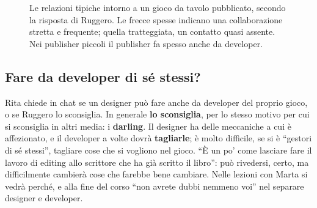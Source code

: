 \begin{figure}[htbp]
\centering
{}
\caption{Le relazioni tipiche intorno a un gioco da tavolo pubblicato, secondo la
risposta di Ruggero. Le frecce spesse indicano una collaborazione stretta e
frequente; quella tratteggiata, un contatto quasi assente. Nei publisher piccoli
il publisher fa spesso anche da developer.}
\label{a1:fig:relazioni}
\end{figure}

\subsection{Fare da developer di sé stessi?}

Rita chiede in chat se un designer può fare anche da developer del proprio
gioco, o se Ruggero lo sconsiglia. In generale \textbf{lo sconsiglia}, per lo
stesso motivo per cui si sconsiglia in altri media: i \textbf{darling}. Il
designer ha delle meccaniche a cui è affezionato, e il developer a volte dovrà
\textbf{tagliarle}; è molto difficile, se si è ``gestori di sé stessi'', tagliare
cose che si vogliono nel gioco. ``È un po' come lasciare fare il lavoro di editing
allo scrittore che ha già scritto il libro'': può rivedersi, certo, ma difficilmente
cambierà cose che farebbe bene cambiare. Nelle lezioni con Marta si vedrà perché,
e alla fine del corso ``non avrete dubbi nemmeno voi'' nel separare designer e
developer.

